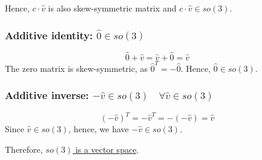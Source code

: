 Hence, \( c \cdot \hat v \) is also skew-symmetric matrix and \( c \cdot \hat v \in so(3) \).

\subsubsection*{Additive identity: \( \hat 0 \in so(3) \)}

\begin{equation*}
    \hat 0 + \hat v = \hat v + \hat 0 = \hat v
\end{equation*}
The zero matrix is skew-symmetric, as \( \hat 0^{T} = -\hat 0 \).
Hence, \( \hat 0 \in so(3) \).

\subsubsection*{Additive inverse: \( -\hat v \in so(3) \quad \forall \hat v \in so(3) \)}

\begin{equation*}
    {(-\hat v)}^{T} = -\hat v^{T} = -(-\hat v) = \hat v
\end{equation*}
Since \( \hat v \in so(3) \), hence, we have \( -\hat v \in so(3) \).

Therefore, \underline{\( so(3) \) is a vector space}.
